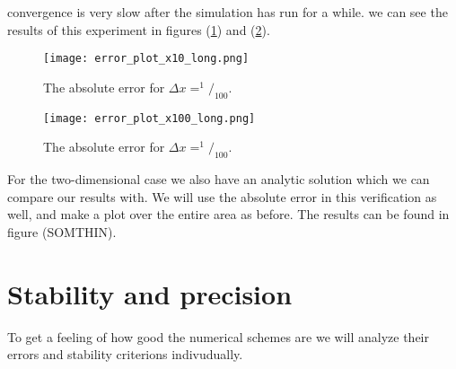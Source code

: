 \documentclass[a4paper,english, 10pt, twoside]{article}
\begin{document}
convergence is very slow after the simulation has run for a while. we can see the results of this experiment in figures (\ref{errors_nx10_long}) and 
(\ref{errors_nx100_long}).
\begin{figure}[H]
 \centering
 \texttt{[image: error\_plot\_x10\_long.png]}
 \caption{The absolute error for $\Delta x = ^1/_{100}$. }
 \label{errors_nx10_long}
\end{figure}
\begin{figure}[H]
 \centering
 \texttt{[image: error\_plot\_x100\_long.png]}
 \caption{The absolute error for $\Delta x = ^1/_{100}$. }
 \label{errors_nx100_long}
\end{figure}
For the two-dimensional case we also have an analytic solution which we can compare our results with. We will use the absolute error in this 
verification as well, and make a plot over the entire area as before. The results can be found in figure (SOMTHIN).
\section{Stability and precision}\label{stability}
To get a feeling of how good the numerical schemes are we will analyze their errors and stability criterions indivudually.
\end{document}
